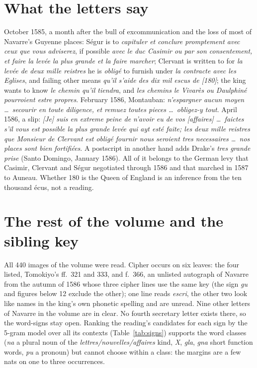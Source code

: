 \documentclass[11pt]{article}
\begin{document}
\section{What the letters say}

October 1585, a month after the bull of excommunication and the loss of most of Navarre's Guyenne places: S\'egur is to \emph{capituler et conclure promptement avec ceux que vous adviserez}, if possible \emph{avec le duc Casimir ou par son consentement, et faire la lev\'ee la plus grande et la faire marcher}; Clervant is written to for \emph{la lev\'ee de deux mille reistres} he is \emph{oblig\'e} to furnish under \emph{la contracte avec les Eglises}, and failing other means \emph{qu'il s'aide des dix mil escus de [180]}; the king wants to know \emph{le chemin qu'il tiendra}, and \emph{les chemins le Vivar\`es ou Daulphin\'e pourroient estre propres}. February 1586, Montauban: \emph{n'espargner aucun moyen \ldots\ secourir en toute diligence, et remuez toutes pieces \ldots\ obligez-y tout}. April 1586, a slip: \emph{[Je] suis en extreme peine de n'avoir eu de vos [affaires] \ldots\ faictes s'il vous est possible la plus grande lev\'ee qui ayt est\'e faite; les deux mille reistres que Monsieur de Clervant est oblig\'e fournir nous seroient tres necessaires \ldots\ nos places sont bien fortifi\'ees}. A postscript in another hand adds Drake's \emph{tres grande prise} (Santo Domingo, January 1586). All of it belongs to the German levy that Casimir, Clervant and S\'egur negotiated through 1586 and that marched in 1587 to Auneau. Whether 180 is the Queen of England is an inference from the ten thousand \'ecus, not a reading.

\section{The rest of the volume and the sibling key}

All 440 images of the volume were read. Cipher occurs on six leaves: the four listed, Tomokiyo's ff.~321 and 333, and f.~366, an unlisted autograph of Navarre from the autumn of 1586 whose three cipher lines use the same key (the sign \emph{gu} and figures below 12 exclude the other); one line reads \emph{escri}, the other two look like names in the king's own phonetic spelling and are unread. Nine other letters of Navarre in the volume are in clear. No fourth secretary letter exists there, so the word-signs stay open. Ranking the reading's candidates for each sign by the 5-gram model over all its contexts (Table~\ref{tab:signs}) supports the word classes (\emph{na} a plural noun of the \emph{lettres/nouvelles/affaires} kind, \emph{X}, \emph{gla}, \emph{gna} short function words, \emph{pu} a pronoun) but cannot choose within a class: the margins are a few nats on one to three occurrences.
\end{document}
